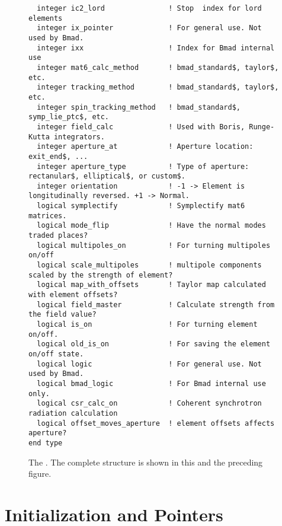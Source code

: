 \begin{figure}[tb]
\begin{verbatim}
  integer ic2_lord               ! Stop  index for lord elements
  integer ix_pointer             ! For general use. Not used by Bmad.
  integer ixx                    ! Index for Bmad internal use
  integer mat6_calc_method       ! bmad_standard$, taylor$, etc.
  integer tracking_method        ! bmad_standard$, taylor$, etc.
  integer spin_tracking_method   ! bmad_standard$, symp_lie_ptc$, etc.
  integer field_calc             ! Used with Boris, Runge-Kutta integrators.
  integer aperture_at            ! Aperture location: exit_end$, ...
  integer aperture_type          ! Type of aperture: rectanular$, elliptical$, or custom$. 
  integer orientation            ! -1 -> Element is longitudinally reversed. +1 -> Normal.
  logical symplectify            ! Symplectify mat6 matrices.
  logical mode_flip              ! Have the normal modes traded places?
  logical multipoles_on          ! For turning multipoles on/off
  logical scale_multipoles       ! multipole components scaled by the strength of element?
  logical map_with_offsets       ! Taylor map calculated with element offsets?
  logical field_master           ! Calculate strength from the field value?
  logical is_on                  ! For turning element on/off.
  logical old_is_on              ! For saving the element on/off state.
  logical logic                  ! For general use. Not used by Bmad.
  logical bmad_logic             ! For Bmad internal use only.
  logical csr_calc_on            ! Coherent synchrotron radiation calculation
  logical offset_moves_aperture  ! element offsets affects aperture?          
end type
\end{verbatim}
\caption[The  (part 2).]{The . 
The complete structure is shown in this and the preceding figure.}
\label{f:ele.struct2}
\end{figure}

\section{Initialization and Pointers}

